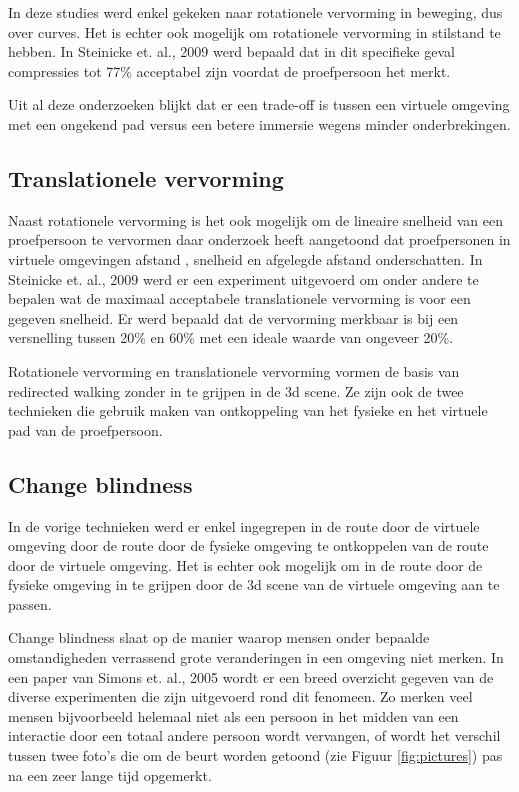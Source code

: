 In deze studies werd enkel gekeken naar rotationele vervorming in beweging, dus 
over curves. Het is echter ook mogelijk om rotationele vervorming in stilstand te
hebben. In Steinicke et. al., 2009 \cite{steinicke09} werd bepaald dat in dit 
specifieke geval compressies tot 77\% acceptabel zijn voordat de proefpersoon het 
merkt.

Uit al deze onderzoeken blijkt dat er een trade-off is tussen een virtuele 
omgeving met een ongekend pad\cite{neth12} versus een betere immersie wegens 
minder onderbrekingen\cite{engel08,kohn01}.


\subsection{Translationele vervorming} \label{1:trans}
Naast rotationele vervorming is het ook mogelijk om de lineaire snelheid van een
proefpersoon te vervormen daar onderzoek heeft aangetoond dat proefpersonen in 
virtuele omgevingen afstand \cite{loomis03}, snelheid \cite{banton05} en 
afgelegde afstand \cite{frenz07} onderschatten. In Steinicke et. al., 2009 \cite{steinicke09} 
werd er een experiment uitgevoerd om onder andere te bepalen wat de maximaal 
acceptabele translationele vervorming is voor een gegeven snelheid. Er werd 
bepaald dat de vervorming merkbaar is bij een versnelling tussen 20\% en 60\% 
met een ideale waarde van ongeveer 20\%.

Rotationele vervorming en translationele vervorming vormen de basis van
redirected walking zonder in te grijpen in de 3d scene. Ze zijn ook de twee 
technieken die gebruik maken van ontkoppeling van het fysieke en het virtuele 
pad van de proefpersoon.


\subsection{Change blindness} \label{1:blindness}
In de vorige technieken werd er enkel ingegrepen in de route door de virtuele
omgeving door de route door de fysieke omgeving te ontkoppelen van de route door
de virtuele omgeving. Het is echter ook mogelijk om in de route door de fysieke
omgeving in te grijpen door de 3d scene van de virtuele omgeving aan te passen.

Change blindness slaat op de manier waarop mensen onder bepaalde omstandigheden
verrassend grote veranderingen in een omgeving niet merken. In een paper van
Simons et. al., 2005 \cite{simons05} wordt er een breed overzicht gegeven van de
diverse experimenten die zijn uitgevoerd rond dit fenomeen. Zo merken veel mensen
bijvoorbeeld helemaal niet als een persoon in het midden van een interactie door
een totaal andere persoon wordt vervangen\cite{simons98}, of wordt het verschil
tussen twee foto's die om de beurt worden getoond (zie Figuur \ref{fig:pictures})
pas na een zeer lange tijd opgemerkt\cite{rensink97}.

